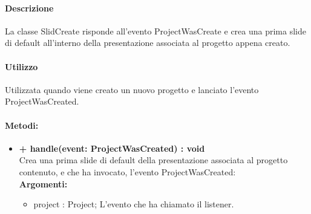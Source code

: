 \paragraph{Descrizione}
La classe SlidCreate risponde all'evento ProjectWasCreate e crea una prima slide di default all'interno della presentazione associata al progetto appena creato.

\paragraph{Utilizzo}
Utilizzata quando viene creato un nuovo progetto e lanciato l'evento ProjectWasCreated.

\paragraph{Metodi:}
\begin{itemize}
	\item \textbf{+ handle(event: ProjectWasCreated) : void}\\
	Crea una prima slide di default della presentazione associata al progetto contenuto, e che ha invocato, l'evento ProjectWasCreated:\\
	\textbf{Argomenti:}
	\begin{itemize}
		\item project : Project;
		L'evento che ha chiamato il listener.
	\end{itemize}
\end{itemize}